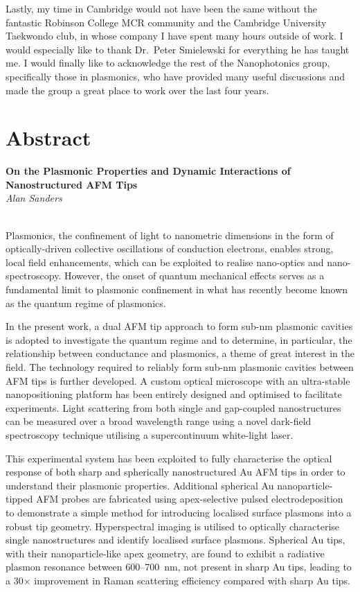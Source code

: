 \documentclass[12pt, a4paper, oneside]{book}
\begin{document}
Lastly, my time in Cambridge would not have been the same without the fantastic Robinson College MCR community and the Cambridge University Taekwondo club, in whose company I have spent many hours outside of work. I would especially like to thank Dr.\ Peter Smielewski for everything he has taught me. I would finally like to acknowledge the rest of the Nanophotonics group, specifically those in plasmonics, who have provided many useful discussions and made the group a great place to work over the last four years.

\newpage 
\section*{Abstract}

\begin{raggedright}
{\bfseries\large On the Plasmonic Properties and Dynamic Interactions of Nanostructured AFM Tips}\\[4pt]
{\emph{Alan Sanders}}
\end{raggedright}\\

\noindent
Plasmonics, the confinement of light to nanometric dimensions in the form of optically-driven collective oscillations of conduction electrons, enables strong, local field enhancements, which can be exploited to realise nano-optics and nano-spectroscopy. However, the onset of quantum mechanical effects serves as a fundamental limit to plasmonic confinement in what has recently become known as the quantum regime of plasmonics.

In the present work, a dual AFM tip approach to form sub-nm plasmonic cavities is adopted to investigate the quantum regime and to determine, in particular, the relationship between conductance and plasmonics, a theme of great interest in the field. The technology required to reliably form sub-nm plasmonic cavities between AFM tips is further developed. A custom optical microscope with an ultra-stable nanopositioning platform has been entirely designed and optimised to facilitate experiments. Light scattering from both single and gap-coupled nanostructures can be measured over a broad wavelength range using a novel dark-field spectroscopy technique utilising a supercontinuum white-light laser.

This experimental system has been exploited to fully characterise the optical response of both sharp and spherically nanostructured Au AFM tips in order to understand their plasmonic properties. Additional spherical Au nanoparticle-tipped AFM probes are fabricated using apex-selective pulsed electrodeposition to demonstrate a simple method for introducing localised surface plasmons into a robust tip geometry. Hyperspectral imaging is utilised to optically characterise single nanostructures and identify localised surface plasmons. Spherical Au tips, with their nanoparticle-like apex geometry, are found to exhibit a radiative plasmon resonance between 600--\SI{700}{nm}, not present in sharp Au tips, leading to a 30$\times$ improvement in Raman scattering efficiency compared with sharp Au tips.
\end{document}
